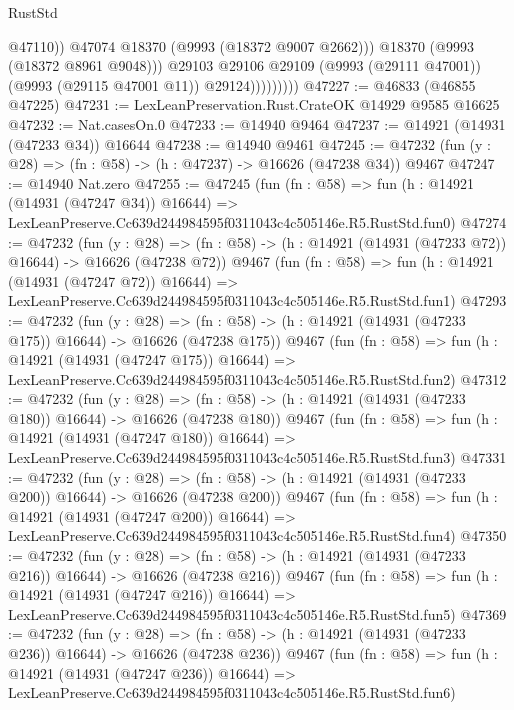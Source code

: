 \begin{lexlean}{RustStd}
\begin{coremodule}
                              @47110))
                          @47074
                          @18370
                          (@9993 (@18372 @9007 @2662)))
                        @18370
                        (@9993 (@18372 @8961 @9048)))
                      @29103
                      @29106
                      @29109
                      (@9993 (@29111 @47001))
                      (@9993 (@29115 @47001 @11))
                      @29124)))))))))
@47227 := @46833 (@46855 @47225)
@47231 := LexLeanPreservation.Rust.CrateOK @14929 @9585 @16625
@47232 := Nat.casesOn.{0}
@47233 := @14940 @9464
@47237 := @14921 (@14931 (@47233 @34)) @16644
@47238 := @14940 @9461
@47245 := @47232 (fun (y : @28) => (fn : @58) -> (h : @47237) -> @16626 (@47238 @34)) @9467
@47247 := @14940 Nat.zero
@47255 := @47245
    (fun (fn : @58) =>
    fun (h : @14921 (@14931 (@47247 @34)) @16644) =>
    LexLeanPreserve.Cc639d244984595f0311043c4c505146e.R5.RustStd.fun0)
@47274 := @47232
    (fun (y : @28) =>
    (fn : @58) -> (h : @14921 (@14931 (@47233 @72)) @16644) -> @16626 (@47238 @72))
    @9467
    (fun (fn : @58) =>
    fun (h : @14921 (@14931 (@47247 @72)) @16644) =>
    LexLeanPreserve.Cc639d244984595f0311043c4c505146e.R5.RustStd.fun1)
@47293 := @47232
    (fun (y : @28) =>
    (fn : @58) -> (h : @14921 (@14931 (@47233 @175)) @16644) -> @16626 (@47238 @175))
    @9467
    (fun (fn : @58) =>
    fun (h : @14921 (@14931 (@47247 @175)) @16644) =>
    LexLeanPreserve.Cc639d244984595f0311043c4c505146e.R5.RustStd.fun2)
@47312 := @47232
    (fun (y : @28) =>
    (fn : @58) -> (h : @14921 (@14931 (@47233 @180)) @16644) -> @16626 (@47238 @180))
    @9467
    (fun (fn : @58) =>
    fun (h : @14921 (@14931 (@47247 @180)) @16644) =>
    LexLeanPreserve.Cc639d244984595f0311043c4c505146e.R5.RustStd.fun3)
@47331 := @47232
    (fun (y : @28) =>
    (fn : @58) -> (h : @14921 (@14931 (@47233 @200)) @16644) -> @16626 (@47238 @200))
    @9467
    (fun (fn : @58) =>
    fun (h : @14921 (@14931 (@47247 @200)) @16644) =>
    LexLeanPreserve.Cc639d244984595f0311043c4c505146e.R5.RustStd.fun4)
@47350 := @47232
    (fun (y : @28) =>
    (fn : @58) -> (h : @14921 (@14931 (@47233 @216)) @16644) -> @16626 (@47238 @216))
    @9467
    (fun (fn : @58) =>
    fun (h : @14921 (@14931 (@47247 @216)) @16644) =>
    LexLeanPreserve.Cc639d244984595f0311043c4c505146e.R5.RustStd.fun5)
@47369 := @47232
    (fun (y : @28) =>
    (fn : @58) -> (h : @14921 (@14931 (@47233 @236)) @16644) -> @16626 (@47238 @236))
    @9467
    (fun (fn : @58) =>
    fun (h : @14921 (@14931 (@47247 @236)) @16644) =>
    LexLeanPreserve.Cc639d244984595f0311043c4c505146e.R5.RustStd.fun6)

\end{coremodule}
\end{lexlean}
